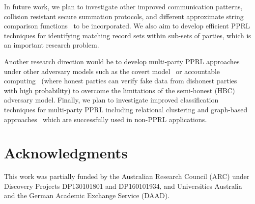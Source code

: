 \documentclass{sig-alternate}
\begin{document}
In future work, we plan to 
investigate other improved communication patterns, 
collision resistant secure summation protocols, 
and different approximate string comparison functions~\cite{Chr12}
to be incorporated.
We also aim to develop efficient PPRL techniques
for identifying matching record sets within sub-sets of parties,
which is an important research problem.

Another research direction would be to
develop multi-party PPRL approaches under
other adversary models such as the covert
model~\cite{Aum10} or accountable computing~\cite{Jia08} 
(where honest parties can verify fake data
from dishonest parties with high probability)
to overcome the limitations
of the semi-honest (HBC) adversary
model.
Finally, we plan to investigate improved
classification techniques for multi-party PPRL
including relational clustering and
graph-based approaches~\cite{Chr12} which are successfully used in
non-PPRL applications.

\section{Acknowledgments}
This work was partially funded by the Australian Research Council
(ARC) under Discovery Projects DP130101801 and DP160101934, and Universities
Australia and the German Academic Exchange Service (DAAD).


  
\end{document}
